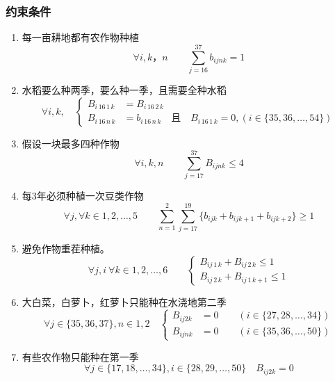 \documentclass[a4paper]{article}
\begin{document}
	\subsubsection{约束条件}
	\begin{enumerate}[]
		\item 每一亩耕地都有农作物种植
		\begin{equation*}
			\forall i,k，n    \quad \quad \sum_{j = 16}^{37} b_{ijnk} = 1
		\end{equation*}
		
		\item 水稻要么种两季，要么种一季，且需要全种水稻
		\begin{equation*}
			\forall i, k, \quad
			\left\{
			\begin{aligned}
				B_{i\, 16\, 1\, k} &= B_{i\, 16\, 2\, k} \\
				B_{i\, 16\, n\, k} &= b_{i\, 16\, n\, k}  \quad  \text{且} \quad  B_{i\, 16\, 1\, k} = 0, (i \in \{35, 36, \dots, 54\})
			\end{aligned}
			\right.
		\end{equation*}
		
		\item 假设一块最多四种作物
		\begin{equation*}
			\forall i,k,n    \quad \quad \sum_{j = 17}^{37} B_{ijnk} \leq 4
		\end{equation*}
		
		\item 每3年必须种植一次豆类作物
		\begin{equation*}
			\forall j, \forall k \in {1,2, \dots, 5}    \quad \quad \sum_{n = 1}^{2} \sum_{j = 17}^{19}  \{ b_{ijk} + b_{ij{k+1}} + b_{ij{k+2}}\}\geq 1 
		\end{equation*}
		
		\item 避免作物重茬种植。
		\begin{equation*}
			\forall j,i \ \forall k \in {1,2, \dots, 6}  \quad \quad
			\left\{
			\begin{aligned}
				B_{ij \, 1\,k} + B_{ij \, 2\,k} \leq 1 \\
				B_{ij \, 2\,k} + B_{ij \, 1\,k+1} \leq 1
			\end{aligned} 
			\right.
		\end{equation*}
		
		\item 大白菜，白萝卜，红萝卜只能种在水浇地第二季
		\begin{equation*}
		\forall j \in \{35, 36, 37\}, n \in {1,2} \quad 
		\left\{
		\begin{aligned}
			B_{i j 2 k} &= 0 \quad \quad (i \in \{27, 28, \dots, 34\}) \\
			B_{i j n k} &= 0 \quad \quad (i \in \{35, 36, \dots, 50\})
		\end{aligned}
		\right.
		\end{equation*}
		
		\item 有些农作物只能种在第一季
		\begin{equation*}
			\forall j \in \{17, 18, \dots ,34\}, i \in \{28,29, \dots , 50\}\quad  B_{ij2k} = 0
		\end{equation*}
	\end{enumerate}
	
\end{document}
